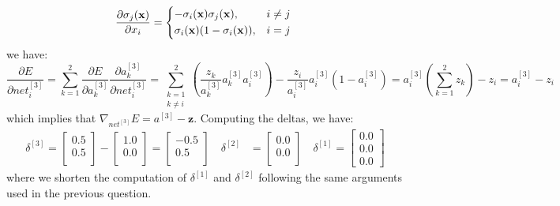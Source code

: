 \documentclass{exam}
\begin{document}
\begin{questions}
\begin{itemize}
                \begin{equation*}
                \frac{\partial \sigma_j(\mathbf{x})}{\partial x_i} = 
                    \begin{cases*}
                        -\sigma_i(\mathbf{x}) \sigma_j(\mathbf{x}), & $i \neq j$ \\
                        \sigma_i(\mathbf{x}) ( 1 - \sigma_i(\mathbf{x})), & $i = j$
                    \end{cases*}
                \end{equation*}
                we have:
                \begin{equation*}
                    \frac{\partial E}{\partial net_i^{[3]}} = 
                    \sum_{k = 1}^{2} \frac{\partial E}{\partial a_k^{[3]}} \frac{\partial a_k^{[3]}}{\partial net_i^{[3]}} =
                    \sum_{\substack{ k = 1 \\ k \neq i}}^{2} \left(\frac{z_k}{a_k^{[3]}} a_k^{[3]} a_i^{[3]}\right) - \frac{z_i}{a_i^{[3]}} a_i^{[3]} ( 1 - a_i^{[3]})  = a_i^{[3]} \left(\sum_{k = 1}^{2} z_k\right) - z_i = a_i^{[3]} - z_i 
                \end{equation*}
                which implies that $\nabla_{net^{[3]}} E = a^{[3]} - \mathbf{z}$. Computing the deltas, we have:
                \begin{align*}
                    \delta^{[3]} = 
                    \begin{bmatrix}
                        0.5  \\
                        0.5 \\
                    \end{bmatrix} -
                    \begin{bmatrix}
                        1.0  \\
                        0.0  \\
                    \end{bmatrix} = 
                    \begin{bmatrix}
                        -0.5  \\
                        0.5  \\
                    \end{bmatrix} \quad
                    \delta^{[2]} &= 
                    \begin{bmatrix}
                        0.0  \\
                        0.0  \\
                    \end{bmatrix} \quad
                    \delta^{[1]} = 
                    \begin{bmatrix}
                        0.0  \\
                        0.0  \\
                        0.0
                    \end{bmatrix}
                \end{align*} 
                where we shorten the computation of $\delta^{[1]}$ and $\delta^{[2]}$ following the same arguments used in the previous question.


\end{itemize}
\end{questions}
\end{document}

